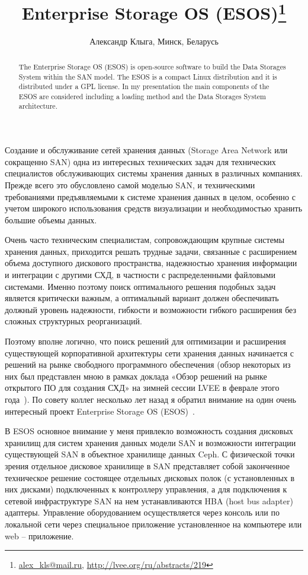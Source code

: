 \documentclass[10pt, a5paper]{article}
\begin{document}
\title{Enterprise Storage OS (ESOS)\footnote{\url{alex_kls@mail.ru}, \url{http://lvee.org/ru/abstracts/219}}}
\author{Александр Клыга, Минск, Беларусь}
\maketitle
\begin{abstract}
The Enterprise Storage OS (ESOS) is open-source software to build the Data Storages System within the SAN model. The ESOS is a compact Linux distribution and it is distributed under a GPL license. In my presentation the main components of the ESOS are considered including a loading method and the Data Storages System architecture.
\end{abstract}

Создание и обслуживание сетей хранения данных (Storage Area Network или сокращенно SAN) одна из интересных технических задач для технических специалистов обслуживающих системы хранения данных в различных компаниях. Прежде всего это обусловлено самой моделью SAN, и техническими требованиями предъявляемыми к системе хранения данных в целом, особенно с учетом широкого использования средств визуализации и необходимостью хранить большие объемы данных.

Очень часто техническим специалистам, сопровождающим крупные системы хранения данных, приходится решать трудные задачи, связанные с расширением объема доступного дискового пространства, надежностью хранения информации и интеграции с другими СХД, в частности с распределенными файловыми системами. Именно поэтому поиск оптимального решения подобных задач является критически важным, а оптимальный вариант должен обеспечивать должный уровень надежности, гибкости и возможности гибкого расширения без сложных структурных реорганизаций.

Поэтому вполне логично, что поиск решений для оптимизации и расширения существующей корпоративной архитектуры сети хранения данных начинается с решений на рынке свободного программного обеспечения (обзор некоторых из них был представлен мною в рамках доклада «Обзор решений на рынке открытого ПО для создания СХД» на зимней сессии LVEE в феврале этого года~\cite{Kliga1}). По совету коллег несколько лет назад я обратил внимание на один очень интересный проект  Enterprise Storage OS (ESOS)~\cite{Kliga2}.

В ESOS основное внимание у меня привлекло возможность создания дисковых хранилищ для систем хранения данных модели SAN и возможности интеграции существующей SAN в объектное хранилище данных Ceph. 
С физической точки зрения отдельное дисковое хранилище в SAN представляет собой законченное техническое решение состоящее отдельных дисковых полок (с установленных в них дисками)  подключенных к контроллеру управления, а для подключения к сетевой инфраструктуре SAN  на нем устанавливаются HBA (host bus adapter) адаптеры. Управление оборудованием осуществляется через консоль или по локальной сети \linebreak через специальное приложение установленное на компьютере или web – приложение.
\end{document}
